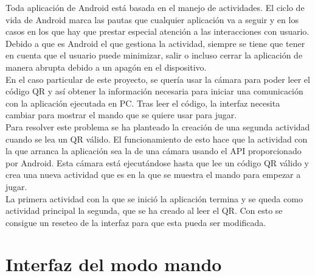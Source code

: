 Toda aplicaci\'on de Android est\'a basada en el manejo de actividades. El ciclo de vida de Android marca las pautas que cualquier aplicaci\'on va a seguir y en los casos en los que hay que prestar especial atenci\'on a las interacciones con usuario. Debido a que es Android el que gestiona la actividad, siempre se tiene que tener en cuenta que el usuario puede minimizar, salir o incluso cerrar la aplicaci\'on de manera abrupta debido a un apag\'on en el dispositivo.
\\
 En el caso particular de este proyecto, se quer\'ia usar la c\'amara para poder leer el c\'odigo QR y as\'i obtener la informaci\'on necesaria para iniciar una comunicaci\'on con la aplicaci\'on ejecutada en PC. Tras leer el c\'odigo, la interfaz necesita cambiar para mostrar el mando que se quiere usar para jugar. 
\\
Para resolver este problema se ha planteado la creaci\'on de una segunda actividad cuando se lea un QR v\'alido. El funcionamiento de esto hace que la actividad con la que arranca la aplicaci\'on sea la de una c\'amara usando el API proporcionado por Android. Esta c\'amara est\'a ejecut\'andose hasta que lee un c\'odigo QR v\'alido y crea una nueva actividad que es en la que se muestra el mando para empezar a jugar.
\\
 La primera actividad con la que se inici\'o la aplicaci\'on termina y se queda como actividad principal la segunda, que se ha creado al leer el QR. Con esto se consigue un reseteo de la interfaz para que esta pueda ser modificada.


\section{Interfaz del modo mando}
\label{cap5:sec:rinterfaz}

